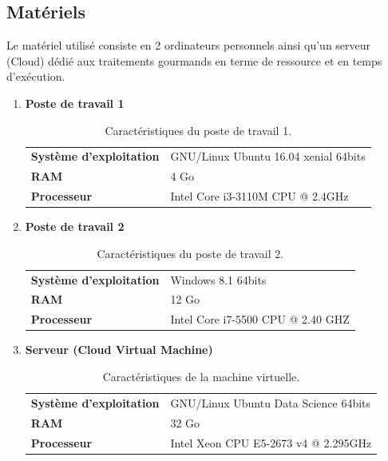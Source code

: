\subsection{Matériels}
Le matériel utilisé consiste en 2 ordinateurs personnels ainsi qu'un serveur (Cloud) dédié aux traitements gourmands en terme de ressource et en temps d'exécution.
\begin{enumerate}
    \item{\textbf{Poste de travail 1}}
    \begin{table}[h!]
        \begin{center}
            \begin{tabular}{|C{5cm}|C{8cm}|}
                \hline
                \textbf{Système d'exploitation} &  GNU/Linux Ubuntu 16.04 xenial 64bits \\
                \textbf{RAM} &  4 Go \\
                \textbf{Processeur} & Intel Core i3-3110M CPU @ 2.4GHz \\
                \hline
            \end{tabular}
        \end{center}
        \caption{Caractéristiques du poste de travail 1.}
    \end{table}
    
    \item{\textbf{Poste de travail 2}}
    \begin{table}[h!]
        \begin{center}
            \begin{tabular}{|C{5cm}|C{8cm}|}
                \hline
                \textbf{Système d'exploitation} &  Windows 8.1 64bits \\
                \textbf{RAM} &  12 Go \\
                \textbf{Processeur} & Intel Core i7-5500 CPU @ 2.40 GHZ \\
                \hline
            \end{tabular}
        \end{center}
        \caption{Caractéristiques du poste de travail 2.}
    \end{table}
    
    \item{\textbf{Serveur (Cloud Virtual Machine)}}
    \begin{table}[h!]
        \begin{center}
            \begin{tabular}{|C{5cm}|C{8cm}|}
                \hline
                \textbf{Système d'exploitation} &  GNU/Linux Ubuntu Data Science 64bits \\
                \textbf{RAM} &  32 Go \\
                \textbf{Processeur} & Intel Xeon CPU E5-2673 v4 @ 2.295GHz \\
                \hline
            \end{tabular}
        \end{center}
        \caption{Caractéristiques de la machine virtuelle.}
    \end{table}
\end{enumerate}   

